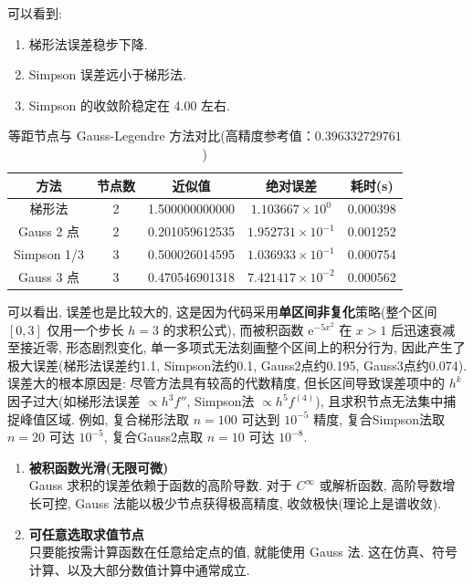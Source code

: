 \documentclass[zihao=-4,a4paper]{ctexart}
\begin{document}
可以看到:
\begin{enumerate}
    \item 梯形法误差稳步下降. 
    \item Simpson 误差远小于梯形法. 
    \item Simpson 的收敛阶稳定在 4.00 左右.
\end{enumerate}


\begin{table}[H]
    \centering
    \caption{等距节点与 Gauss-Legendre 方法对比(高精度参考值：$0.396332729761$)}
    \label{tab:gauss_vs_equidistant}
    \small
    \begin{tabular}{ccccc}
        \toprule
        方法 & 节点数 & 近似值 & 绝对误差 & 耗时(s) \\
        \midrule
        梯形法        & 2 & 1.500000000000 & $1.103667\times10^{0}$  & 0.000398 \\
        Gauss 2 点    & 2 & 0.201059612535 & $1.952731\times10^{-1}$ & 0.001252 \\
        Simpson 1/3   & 3 & 0.500026014595 & $1.036933\times10^{-1}$ & 0.000754 \\
        Gauss 3 点    & 3 & 0.470546901318 & $7.421417\times10^{-2}$ & 0.000562 \\
        \bottomrule
    \end{tabular}
\end{table}

可以看出, 误差也是比较大的, 这是因为代码采用\textbf{单区间非复化}策略(整个区间 $[0,3]$ 仅用一个步长 $h=3$ 的求积公式), 而被积函数 $\mathrm{e}^{-5x^2}$ 在 $x>1$ 后迅速衰减至接近零, 形态剧烈变化, 单一多项式无法刻画整个区间上的积分行为, 因此产生了极大误差(梯形法误差约1.1, Simpson法约0.1, Gauss2点约0.195, Gauss3点约0.074). 误差大的根本原因是: 尽管方法具有较高的代数精度, 但长区间导致误差项中的 $h^k$ 因子过大(如梯形法误差 $\propto h^3 f''$, Simpson法 $\propto h^5 f^{(4)}$), 且求积节点无法集中捕捉峰值区域. 例如, 复合梯形法取 $n=100$ 可达到 $10^{-5}$ 精度, 复合Simpson法取 $n=20$ 可达 $10^{-5}$, 复合Gauss2点取 $n=10$ 可达 $10^{-8}$. 



\begin{enumerate}
\item \textbf{被积函数光滑(无限可微)} \\
  Gauss 求积的误差依赖于函数的高阶导数. 对于 \(C^\infty\) 或解析函数, 高阶导数增长可控, Gauss 法能以极少节点获得极高精度, 收敛极快(理论上是谱收敛). 

\item \textbf{可任意选取求值节点} \\
  只要能按需计算函数在任意给定点的值, 就能使用 Gauss 法. 这在仿真、符号计算、以及大部分数值计算中通常成立. 
\end{enumerate}
\end{document}
